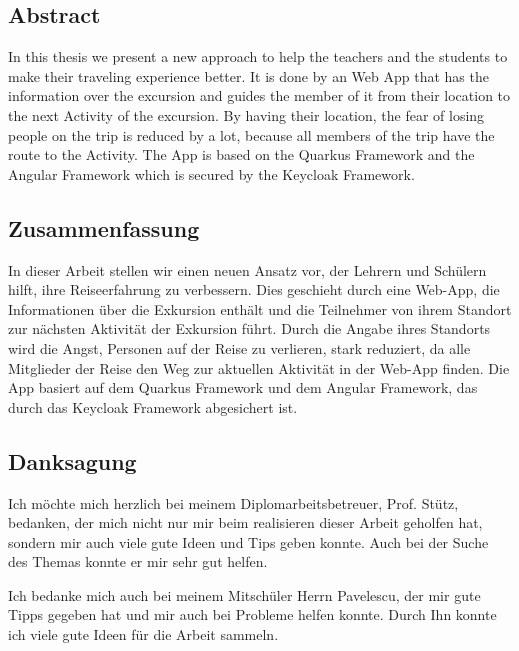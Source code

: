 \begin{spacing}{1}
    \chapter*{Abstract}
\end{spacing}
In this thesis we present a new approach to help the teachers and the students to make their traveling experience better. It is done by an Web App that has the information over the excursion and guides the member of it from their location to the next Activity of the excursion. By having their location, the fear of losing people on the trip is reduced by a lot, because all members of the trip have the route to the Activity. The App is based on the Quarkus Framework and the Angular Framework which is secured by the Keycloak Framework.  


\newpage
\begin{spacing}{1}
    \chapter*{Zusammenfassung}
\end{spacing}
In dieser Arbeit stellen wir einen neuen Ansatz vor, der Lehrern und Schülern hilft, ihre Reiseerfahrung zu verbessern. Dies geschieht durch eine Web-App, die Informationen über die Exkursion enthält und die Teilnehmer von ihrem Standort zur nächsten Aktivität der Exkursion führt. Durch die Angabe ihres Standorts wird die Angst, Personen auf der Reise zu verlieren, stark reduziert, da alle Mitglieder der Reise den Weg zur aktuellen Aktivität in der Web-App finden. Die App basiert auf dem Quarkus Framework und dem Angular Framework, das durch das Keycloak Framework abgesichert ist.

\newpage
\begin{spacing}{1}
    \chapter*{Danksagung}
\end{spacing}
Ich möchte mich herzlich bei meinem Diplomarbeitsbetreuer, Prof. Stütz, bedanken, der mich nicht nur mir beim realisieren dieser Arbeit geholfen hat, sondern mir auch viele gute Ideen und Tips geben konnte. Auch bei der Suche des Themas konnte er mir sehr gut helfen.

Ich bedanke mich auch bei meinem Mitschüler Herrn Pavelescu, der mir gute Tipps gegeben hat und mir auch bei Probleme helfen konnte. Durch Ihn konnte ich viele gute Ideen für die Arbeit sammeln.
